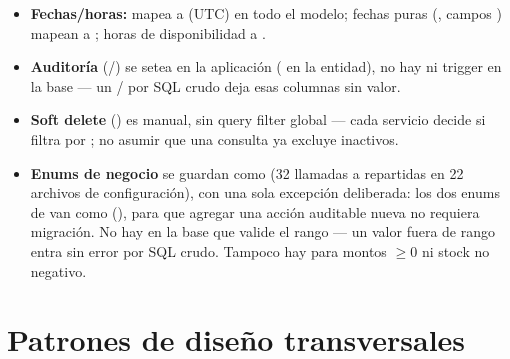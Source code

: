 \begin{itemize}
  \item \textbf{Fechas/horas:}  mapea a  (UTC) en todo el modelo; fechas puras (, campos ) mapean a ; horas de disponibilidad a .
  \item \textbf{Auditoría} (/) se setea en la aplicación ( en la entidad), no hay  ni trigger en la base --- un / por SQL crudo deja esas columnas sin valor.
  \item \textbf{Soft delete} () es manual, sin query filter global --- cada servicio decide si filtra por ; no asumir que una consulta ya excluye inactivos.
  \item \textbf{Enums de negocio} se guardan como  (32 llamadas a \allowbreak {} repartidas en 22 archivos de configuración), con una sola excepción deliberada: los dos enums de \allowbreak {} van como  (\allowbreak {}), para que agregar una acción auditable nueva no requiera migración. No hay  en la base que valide el rango --- un valor fuera de rango entra sin error por SQL crudo. Tampoco hay  para montos $\geq 0$ ni stock no negativo.
\end{itemize}

\section{Patrones de diseño transversales}
\label{sec:patrones-transversales}

